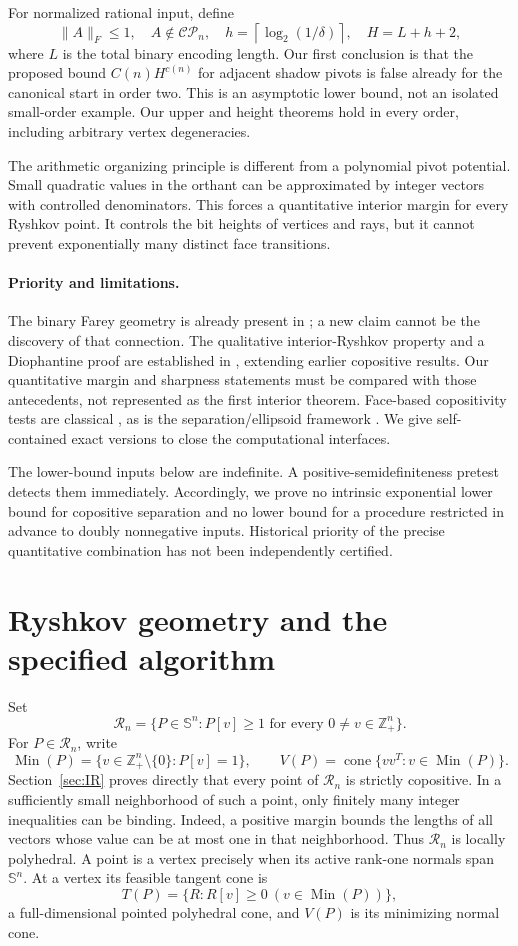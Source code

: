 \documentclass[11pt]{article}
\theoremstyle{remark}\newtheorem{remark}[theorem]{Remark}
\newcommand{\CP}{\mathcal{CP}}
\newcommand{\Ry}{\mathcal R}
\newcommand{\Min}{\operatorname{Min}}
\newcommand{\cone}{\operatorname{cone}}
\newcommand{\norm}[1]{\lVert#1\rVert}
\begin{document}
For normalized rational input, define
\begin{equation}\label{eq:H}
 \norm A_F\le1,\quad A\notin\CP_n,\quad
 h=\left\lceil\log_2(1/\delta)\right\rceil,\quad H=L+h+2,
\end{equation}
where $L$ is the total binary encoding length. Our first conclusion is that the proposed bound $C(n)H^{c(n)}$ for adjacent shadow pivots is false already for the canonical start in order two. This is an asymptotic lower bound, not an isolated small-order example. Our upper and height theorems hold in every order, including arbitrary vertex degeneracies.

The arithmetic organizing principle is different from a polynomial pivot potential. Small quadratic values in the orthant can be approximated by integer vectors with controlled denominators. This forces a quantitative interior margin for every Ryshkov point. It controls the bit heights of vertices and rays, but it cannot prevent exponentially many distinct face transitions.

\paragraph{Priority and limitations.}
The binary Farey geometry is already present in \cite[Section 4]{DSV21}; a new claim cannot be the discovery of that connection. The qualitative interior-Ryshkov property and a Diophantine proof are established in \cite{OS26}, extending earlier copositive results. Our quantitative margin and sharpness statements must be compared with those antecedents, not represented as the first interior theorem. Face-based copositivity tests are classical \cite{GTHC22}, as is the separation/ellipsoid framework \cite{GLS81}. We give self-contained exact versions to close the computational interfaces.

The lower-bound inputs below are indefinite. A positive-semidefiniteness pretest detects them immediately. Accordingly, we prove no intrinsic exponential lower bound for copositive separation and no lower bound for a procedure restricted in advance to doubly nonnegative inputs. Historical priority of the precise quantitative combination has not been independently certified.

\section{Ryshkov geometry and the specified algorithm}
Set
\[
 \Ry_n=\{P\in\mathbb S^n:P[v]\ge1\text{ for every }0\ne v\in\mathbb Z_+^n\}.
\]
For $P\in\Ry_n$, write
\[
 \Min(P)=\{v\in\mathbb Z_+^n\setminus\{0\}:P[v]=1\},\qquad
 V(P)=\cone\{vv^T:v\in\Min(P)\}.
\]
Section~\ref{sec:IR} proves directly that every point of $\Ry_n$ is strictly copositive. In a sufficiently small neighborhood of such a point, only finitely many integer inequalities can be binding. Indeed, a positive margin bounds the lengths of all vectors whose value can be at most one in that neighborhood. Thus $\Ry_n$ is locally polyhedral. A point is a vertex precisely when its active rank-one normals span $\mathbb S^n$. At a vertex its feasible tangent cone is
\[
 T(P)=\{R:R[v]\ge0\ (v\in\Min(P))\},
\]
a full-dimensional pointed polyhedral cone, and $V(P)$ is its minimizing normal cone.
\end{document}
